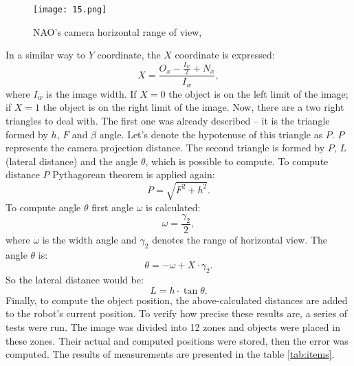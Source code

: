         \begin{figure}[b!]
          \centering
          \texttt{[image: 15.png]} 
          \caption{NAO's camera horizontal range of view, \cite{naoDocumentation}}
          \label{horizontalRange}
        \end{figure}

        In a similar way to \(Y\) coordinate, the \(X\) coordinate is expressed: 
        \begin{equation}
          X = \frac{O_{x} - \frac{I_{w}}{2} + N_{x}}{I_{w}},
        \end{equation}
          where \( I_{w}\) is the image width. If \(X = 0\) the object is on the left limit of the image; if \(X = 1\) the object is on the right limit of the image. Now, there are a two right triangles to deal with. The first one was already described -- it is the triangle formed by \(h\), \(F\) and \(\beta\) angle. Let's denote the hypotenuse of this triangle as \(P\). \(P\) represents the camera projection distance. The second triangle is formed by \(P\), \(L\) (lateral distance) and the angle \(\theta\), which is possible to compute. To compute distance \(P\) Pythagorean theorem is applied again:
          \begin{equation}
            P = \sqrt{F^2 + h^2}. 
          \end{equation}
           To compute angle \(\theta\) first angle \( \omega \) is calculated:
          \begin{equation}
        \omega = \frac{\gamma_{2}}{2},
          \end{equation}
          where \( \omega \) is the width angle and \(\gamma_{2}\) denotes the range of horizontal view. The angle \( \theta \) is:
          \begin{equation}
                \theta = -\omega + X\cdot \gamma_{2}.
          \end{equation}
          So the lateral distance would be:
          \begin{equation}
            L = h\cdot \tan \theta.
          \end{equation}
              Finally, to compute the object position, the above-calculated distances are added to the robot's current position. To verify how precise these results are, a series of tests were run. The image was divided into 12 zones and objects were placed in these zones. Their actual and computed positions were stored, then the error was computed. The results of measurements are presented in the table \ref{tab:items}. 
